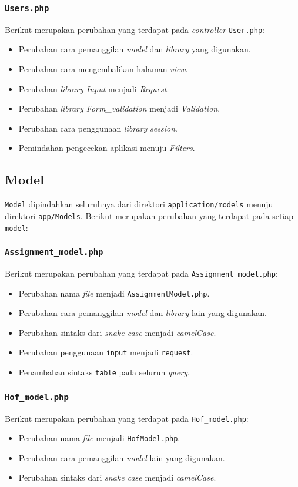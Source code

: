 \subsubsection{\texttt{Users.php}}
Berikut merupakan perubahan yang terdapat pada \textit{controller} \texttt{User.php}:
\begin{itemize}
	\item Perubahan cara pemanggilan \textit{model} dan \textit{library} yang digunakan.
	\item Perubahan cara mengembalikan halaman \textit{view}.
	\item Perubahan \textit{library Input} menjadi \textit{Request}.
	\item Perubahan \textit{library Form\_validation} menjadi \textit{Validation}.
	\item Perubahan cara penggunaan \textit{library} \textit{session}.
	\item Pemindahan pengecekan aplikasi menuju \textit{Filters}.
\end{itemize}

\subsection{Model}
\texttt{Model} dipindahkan seluruhnya dari direktori \texttt{application/models} menuju direktori \texttt{app/Models}. Berikut merupakan perubahan yang terdapat pada setiap \texttt{model}:
\subsubsection{\texttt{Assignment\_model.php}}
Berikut merupakan perubahan yang terdapat pada \texttt{Assignment\_model.php}:
\begin{itemize}
	\item Perubahan nama \textit{file} menjadi \texttt{AssignmentModel.php}.
	\item Perubahan cara pemanggilan \textit{model} dan \textit{library} lain yang digunakan.
	\item Perubahan sintaks dari \textit{snake case} menjadi \textit{camelCase}.
	\item Perubahan penggunaan \texttt{input} menjadi \texttt{request}.
	\item Penambahan sintaks \texttt{table} pada seluruh \textit{query}.
\end{itemize}

\subsubsection{\texttt{Hof\_model.php}}
Berikut merupakan perubahan yang terdapat pada \texttt{Hof\_model.php}:
\begin{itemize}
	\item Perubahan nama \textit{file} menjadi \texttt{HofModel.php}.
	\item Perubahan cara pemanggilan \textit{model} lain yang digunakan.
	\item Perubahan sintaks dari \textit{snake case} menjadi \textit{camelCase}.
\end{itemize}

